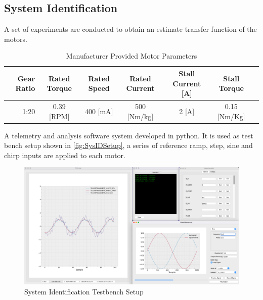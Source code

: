         \subsection{System Identification}
        A set of experiments are conducted to obtain an estimate transfer function of the motors.
        \begin{table}[H]
            \centering
                \begin{tabular}{|r|c|c|c|c|c|c|}
                    \hline 
                    Gear Ratio & Rated Torque & Rated Speed  & Rated Current & Stall Current [A] & Stall Torque \\
                    \hline
                     1:20  & 0.39 [RPM] & 400 [mA] & 500 [Nm/kg] & 2  [A] & 0.15 [Nm/Kg] \\
                    \hline
                \end{tabular}
                \caption{Manufacturer Provided Motor Parameters}
        \end{table}
        A telemetry and analysis software system developed in python. It is used as test bench setup 
        shown in \ref{fig:SysIDSetup}, a series of reference ramp, step, sine and chirp inputs are applied to each motor.  
        \begin{figure}[H]
            \centering
            \includegraphics[height=0.45\textwidth]{SysIDMotorSetUp.png}
            \caption{System Identification Testbench Setup}
            \label{fig:SysIDSetUp}
        \end{figure}

